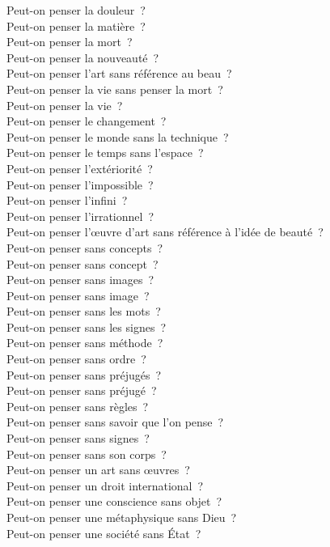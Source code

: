 \documentclass[a4paper,12pt]{article}
\begin{document}
Peut-on penser la douleur ? \\
Peut-on penser la matière ? \\
Peut-on penser la mort ? \\
Peut-on penser la nouveauté ? \\
Peut-on penser l'art sans référence au beau ? \\
Peut-on penser la vie sans penser la mort ? \\
Peut-on penser la vie ? \\
Peut-on penser le changement ? \\
Peut-on penser le monde sans la technique ? \\
Peut-on penser le temps sans l'espace ? \\
Peut-on penser l'extériorité ? \\
Peut-on penser l'impossible ? \\
Peut-on penser l'infini ? \\
Peut-on penser l'irrationnel ? \\
Peut-on penser l'œuvre d'art sans référence à l'idée de beauté ? \\
Peut-on penser sans concepts ? \\
Peut-on penser sans concept ? \\
Peut-on penser sans images ? \\
Peut-on penser sans image ? \\
Peut-on penser sans les mots ? \\
Peut-on penser sans les signes ? \\
Peut-on penser sans méthode ? \\
Peut-on penser sans ordre ? \\
Peut-on penser sans préjugés ? \\
Peut-on penser sans préjugé ? \\
Peut-on penser sans règles ? \\
Peut-on penser sans savoir que l'on pense ? \\
Peut-on penser sans signes ? \\
Peut-on penser sans son corps ? \\
Peut-on penser un art sans œuvres ? \\
Peut-on penser un droit international ? \\
Peut-on penser une conscience sans objet ? \\
Peut-on penser une métaphysique sans Dieu ? \\
Peut-on penser une société sans État ? \\
\end{document}
